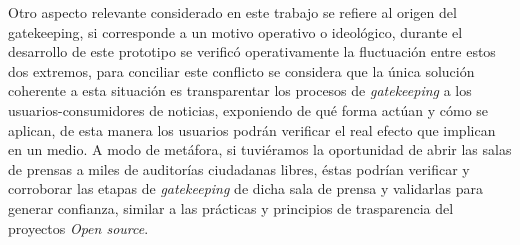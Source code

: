 Otro aspecto relevante considerado en este trabajo se refiere al origen del gatekeeping, si corresponde a un motivo operativo o ideológico, durante el desarrollo de este prototipo se verificó operativamente la fluctuación entre estos dos extremos, para conciliar este conflicto se considera que la única solución coherente a esta situación es transparentar los procesos de \emph{gatekeeping} a los usuarios-consumidores de noticias, exponiendo de qué forma actúan y cómo se aplican, de esta manera los usuarios podrán verificar el real efecto que implican en un medio. A modo de metáfora, si tuviéramos la oportunidad de abrir las salas de prensas a miles de auditorías ciudadanas libres, éstas podrían verificar y corroborar las etapas de \emph{gatekeeping} de dicha sala de prensa y validarlas para generar confianza, similar a las prácticas y principios de trasparencia del proyectos \emph{Open source}.
